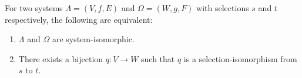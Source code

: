 For two systems $\Lambda = (V, f, E)$ and $\Omega = (W, g, F)$ with selections $s$ and $t$ respectively, the following are equivalent:

\begin{enumerate}
\item[(a)] $\Lambda$ and $\Omega$ are system-isomorphic.
\item[(b)] There exists a bijection $q: V \to W$ such that $q$ is a selection-isomorphism from $s$ to $t$.
\end{enumerate}
